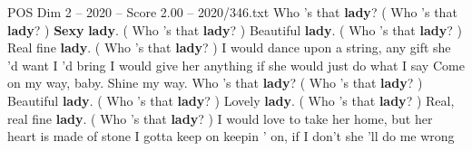 \begin{textsample}{POS Dim 2 – 2020 – Score 2.00 – 2020/346.txt}  \label{ex:f2_pos_021}
Who 's that \textbf{lady}? ( Who 's that \textbf{lady}? ) \textbf{Sexy} \textbf{lady}. ( Who 's that \textbf{lady}? ) Beautiful \textbf{lady}. ( Who 's that \textbf{lady}? ) Real fine \textbf{lady}. ( Who 's that \textbf{lady}? ) I would dance upon a string, any gift she 'd want I 'd bring I would give her anything if she would just do what I say Come on my way, baby.
Shine my way.
Who 's that \textbf{lady}? ( Who 's that \textbf{lady}? ) Beautiful \textbf{lady}. ( Who 's that \textbf{lady}? ) Lovely \textbf{lady}. ( Who 's that \textbf{lady}? ) Real, real fine \textbf{lady}. ( Who 's that \textbf{lady}? ) I would love to take her home, but her heart is made of stone I gotta keep on keepin ' on, if I don't she 'll do me wrong

\end{textsample}
